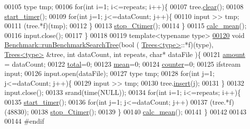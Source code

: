 \begin{DoxyCode}
00105   type tmp;
00106   \textcolor{keywordflow}{for}(\textcolor{keywordtype}{int} i=1; i<=repeats; i++)\{
00107     tree.\hyperlink{class_trees_ac9020e649202c980ecb9917e13524471}{clear}();
00108     \hyperlink{class_timer_a83d4b873e3275a61004b5679672045c0}{start\_timer}();
00109     \textcolor{keywordflow}{for}(\textcolor{keywordtype}{int} j=1; j<=dataCount; j++)\{
00110       input >> tmp;
00111       (tree.*f)(tmp);
00112     \}
00113     \hyperlink{class_benchmark_ab65889d4c2df3eb503048ab1cc6e7413}{stop\_Ctimer}();
00114   \}
00115   \hyperlink{class_benchmark_ac4d5360d2850510913efe07cf957f4c1}{calc\_mean}();
00116   input.close();
00117 \}
00118 
00119 \textcolor{keyword}{template}<\textcolor{keyword}{typename} type>
\hypertarget{benchmark_8hh_source_l00120}{}\hyperlink{class_benchmark_a9e6b5ef8df351452be5fa0c8d127367a}{00120} \textcolor{keywordtype}{void} \hyperlink{class_benchmark_a9e6b5ef8df351452be5fa0c8d127367a}{Benchmark::runBenchmarkSearchTree}(\textcolor{keywordtype}{bool} (
      \hyperlink{class_trees}{Trees<type>}::*f)(type), \hyperlink{class_trees}{Trees<type>} &tree, \textcolor{keywordtype}{int} dataCount, \textcolor{keywordtype}{int} repeats, \textcolor{keywordtype}{char}* dataFile
      )\{
00121   \hyperlink{class_benchmark_a1d0eaa6febe9b7a7f5f5147e83f60910}{amount} = dataCount;
00122   \hyperlink{class_benchmark_a7130c0718e3a3ab2fea70285dab122a2}{total}=0; 
00123   \hyperlink{class_benchmark_aa88092b6164ad7d1243162d3012f729a}{mean}=0;
00124   \hyperlink{class_benchmark_a3a56c7dad0b21e490f3024d5d0027f31}{counter}=0;
00125   ifstream input;
00126   input.open(dataFile);
00127   type tmp;
00128   \textcolor{keywordflow}{for}(\textcolor{keywordtype}{int} j=1; j<=dataCount; j++)\{
00129     input >> tmp;
00130     tree.\hyperlink{class_trees_a00b4642b409350691f93b4b94598e68e}{insert}(j);
00131   \}
00132   input.close();
00133   srand(time(NULL));
00134   \textcolor{keywordflow}{for}(\textcolor{keywordtype}{int} i=1; i<=repeats; i++)\{
00135     \hyperlink{class_timer_a83d4b873e3275a61004b5679672045c0}{start\_timer}();
00136     \textcolor{keywordflow}{for}(\textcolor{keywordtype}{int} j=1; j<=dataCount; j++)
00137       (tree.*f)(48830);
00138     \hyperlink{class_benchmark_ab65889d4c2df3eb503048ab1cc6e7413}{stop\_Ctimer}();
00139   \}
00140   \hyperlink{class_benchmark_ac4d5360d2850510913efe07cf957f4c1}{calc\_mean}();
00141 \}
00142 
00143 
00144 \textcolor{preprocessor}{#endif}
\end{DoxyCode}
